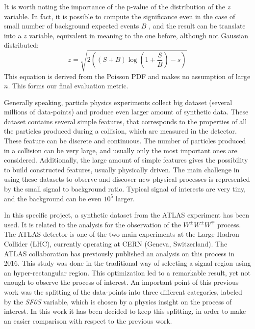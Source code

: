 \documentclass{article}
\begin{document}
It is worth noting the importance of the p-value of the distribution of the $z$ variable. In fact, it is possible to compute the significance even in the case of small number of background expected events $B$ \cite{cowan_stat}, and the result can be translate into a $z$ variable, equivalent in meaning to the one before, although not Gaussian distributed:
\[ z = \sqrt{2 \left( (S+B) \log \left(1 + \frac{S}{B} \right) - s \right)}\]
This equation is derived from the Poisson PDF and makes no assumption of large $n$. This forms our final evaluation metric.

Generally speaking, particle physics experiments collect big dataset (several millions of data-points) and produce even larger amount of synthetic data.
These dataset contains several simple features, that corresponds to the properties of all the particles produced during a collision, which are measured in the detector. These feature can be discrete and continuous. The number of particles produced in a collision can be very large, and usually only the most important ones are considered. Additionally, the large amount of simple features gives the possibility to build constructed features, usually physically driven. 
The main challenge in using these datasets to observe and discover new physical processes is represented by the small signal to background ratio. Typical signal of interests are very tiny, and the background can be even $10^5$ larger.

In this specific project, a synthetic dataset from the ATLAS experiment has been used. It is related to the analysis for the observation of the $W^{\pm}W^{\pm}W^{\mp}$ process.
The ATLAS detector is one of the two main experiments at the Large Hadron Collider (LHC), currently operating at CERN (Geneva, Switzerland).
The ATLAS collaboration has previously published an analysis \cite{Aaboud:2016ftt} on this process in 2016.
This study was done in the traditional way of selecting a signal region using an hyper-rectangular region. This optimization led to a remarkable result, yet not enough to observe the process of interest. An important point of this previous work was the splitting of the data-points into three different categories, labeled by the \textit{SF0S} variable, which is chosen by a physics insight on the process of interest. In this work it has been decided to keep this splitting, in order to make an easier comparison with respect to the previous work.
\end{document}
